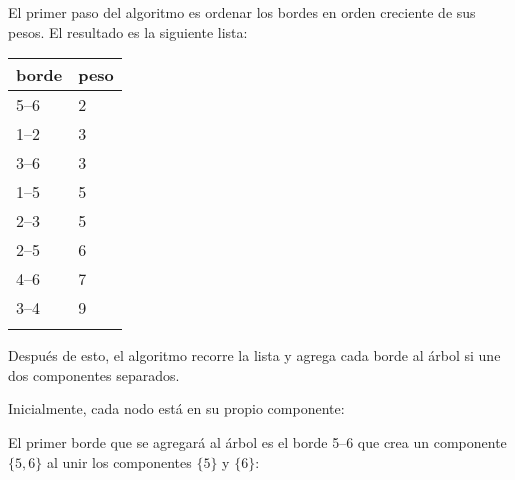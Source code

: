 \begin{samepage}
El primer paso del algoritmo es ordenar los
bordes en orden creciente de sus pesos.
El resultado es la siguiente lista:

\begin{tabular}{ll}
\\
borde & peso \\
\hline
5--6 & 2 \\
1--2 & 3 \\
3--6 & 3 \\
1--5 & 5 \\
2--3 & 5 \\
2--5 & 6 \\
4--6 & 7 \\
3--4 & 9 \\
\\
\end{tabular}
\end{samepage}

Después de esto, el algoritmo recorre la lista
y agrega cada borde al árbol si une
dos componentes separados.

Inicialmente, cada nodo está en su propio componente:

\begin{center}
\end{center}
El primer borde que se agregará al árbol es
el borde 5--6 que crea un componente $\{5,6\}$
al unir los componentes $\{5\}$ y $\{6\}$:

